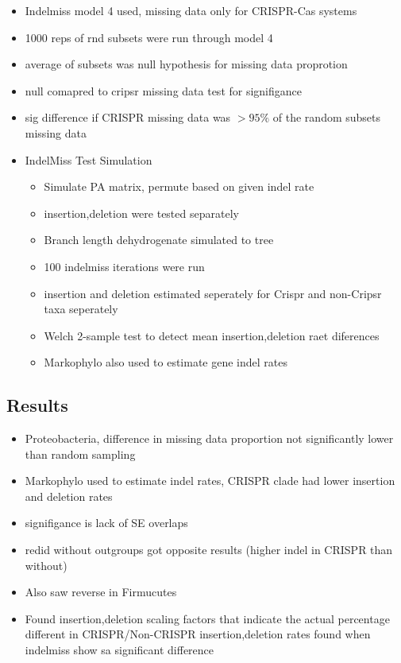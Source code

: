 \documentclass[10pt,letter]{article}
\begin{document}
\begin{itemize}
    \item Indelmiss model 4 used, missing data only for CRISPR-Cas systems
    \item 1000 reps of rnd subsets were run through model 4
    \item average of subsets was null hypothesis for missing data proprotion
    \item null comapred to cripsr missing data test for signifigance
    \item sig difference if CRISPR missing data was $> 95\%$ of the random subsets missing data
    \item IndelMiss Test Simulation
    \begin{itemize}
        \item Simulate PA matrix, permute based on given indel rate
        \item insertion,deletion were tested separately
        \item Branch length dehydrogenate simulated to tree
        \item 100 indelmiss iterations were run
        \item insertion and deletion estimated seperately for Crispr and non-Cripsr taxa seperately
        \item Welch 2-sample test to detect mean insertion,deletion raet diferences
        \item Markophylo also used to estimate gene indel rates
    \end{itemize}
\end{itemize}
\subsection*{Results}
\begin{itemize}
    \item Proteobacteria, difference in missing data proportion not significantly lower than random sampling
    \item Markophylo used to estimate indel rates, CRISPR clade had lower insertion and deletion rates
    \item signifigance is lack of SE overlaps
    \item redid without outgroups got opposite results  (higher indel in CRISPR than without)
    \item Also saw reverse in Firmucutes
    \item Found insertion,deletion scaling factors that indicate the actual percentage different in CRISPR/Non-CRISPR insertion,deletion rates found when indelmiss show sa significant difference
\end{itemize}
\end{document}
